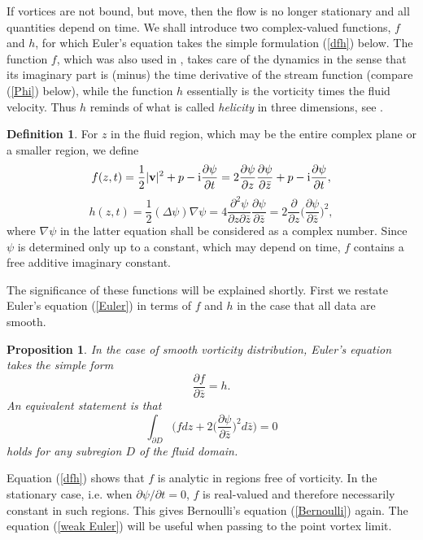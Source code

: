 \documentclass[reqno,12pt]{article}
\theoremstyle{plain}
\newtheorem{proposition}[thm]{Proposition}
\theoremstyle{definition}
\newtheorem{definition}{Definition}[section]
\numberwithin{equation}{section}
\numberwithin{figure}{section}
\def\I{\mathrm{i}}
\begin{document}
If vortices are not bound, but move, then the flow is no longer stationary and all quantities depend on time. 
We shall introduce two complex-valued functions, $f$ and $h$, for which Euler's equation takes the
simple formulation (\ref{dfh}) below. The function $f$, which was also used in \cite{Gustafsson-2019},
takes care of the dynamics in the sense that its imaginary part is (minus) the time derivative
of the stream function (compare (\ref{Phi}) below), while the function $h$ essentially is the vorticity times the fluid velocity. Thus $h$
reminds of what is called {\it helicity} in three dimensions, see \cite{Arnold-Khesin-1998}. 
\begin{definition}
For $z$ in the fluid region, which may be the entire complex plane or a smaller region, we define
\begin{equation}\label{f}
f(z,t)=\frac{1}{2}|{\bf v}|^2+p-\I\frac{\partial \psi}{\partial t}
=2\frac{\partial \psi}{\partial z}\frac{\partial \psi}{\partial \bar{z}}+p-\I \frac{\partial \psi}{\partial t},
\end{equation}
\begin{equation}\label{h}
h(z,t)=\frac{1}{2}(\Delta \psi) \nabla \psi 
=4\frac{\partial^2 \psi}{\partial z\partial \bar{z}}\frac{\partial \psi}{\partial \bar{z}}
=2\frac{\partial }{\partial z}\Big(\frac{\partial \psi}{\partial \bar{z}}\Big)^2,
\end{equation}
where $\nabla\psi$ in the latter equation shall be considered as a complex number.
Since $\psi$ is determined only up to a constant, which may depend on time,  $f$ contains a free
additive imaginary constant.
\end{definition}

The significance of these functions will be explained shortly. First we restate Euler's equation (\ref{Euler})
in terms of $f$ and $h$ in the case that all data are smooth.

\begin{proposition}\label{prop:dfh}
In the case of smooth vorticity distribution, Euler's equation takes the simple form
\begin{equation}\label{dfh}
\frac{\partial f}{\partial\bar{z}}=h.
\end{equation}
An equivalent statement is that
\begin{equation}\label{weak Euler}
\int_{\partial D}\Big( fdz+2\big(\frac{\partial \psi}{\partial \bar{z}}\big)^2d\bar{z}\Big)=0
\end{equation}
holds for any subregion $D$ of the fluid domain. 
\end{proposition}
Equation (\ref{dfh}) shows that $f$ is {analytic in regions free of vorticity}. In the stationary case, i.e. when $\partial{\psi}/\partial t=0$,
$f$ is real-valued and therefore necessarily constant in such regions. This gives Bernoulli's equation (\ref{Bernoulli}) again.
The equation (\ref{weak Euler}) will be useful when passing to the point vortex limit.
\end{document}
